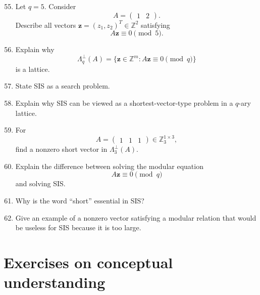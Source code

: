 \documentclass[11pt]{article}
\begin{document}
\begin{enumerate}
	\setcounter{enumi}{54}
	\item Let \(q=5\). Consider
	\[
	A=
	\begin{pmatrix}
		1 & 2
	\end{pmatrix}.
	\]
	Describe all vectors \(\mathbf{z}=(z_1,z_2)^T\in\mathbb{Z}^2\) satisfying
	\[
	A\mathbf{z}\equiv 0 \pmod 5.
	\]
	
	\item Explain why
	\[
	\Lambda_q^\perp(A)=\{\mathbf{z}\in\mathbb{Z}^m : A\mathbf{z}\equiv 0 \pmod q\}
	\]
	is a lattice.
	
	\item State SIS as a search problem.
	
	\item Explain why SIS can be viewed as a shortest-vector-type problem in a \(q\)-ary lattice.
	
	\item For
	\[
	A=
	\begin{pmatrix}
		1 & 1 & 1
	\end{pmatrix}
	\in \mathbb{Z}_3^{1\times 3},
	\]
	find a nonzero short vector in \(\Lambda_3^\perp(A)\).
	
	\item Explain the difference between solving the modular equation
	\[
	A\mathbf{z}\equiv 0 \pmod q
	\]
	and solving SIS.
	
	\item Why is the word ``short'' essential in SIS?
	
	\item Give an example of a nonzero vector satisfying a modular relation that would be useless for SIS because it is too large.
\end{enumerate}

\section{Exercises on conceptual understanding}
\end{document}
